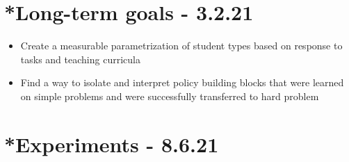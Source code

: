 \documentclass[letterpaper]{article}
\theoremstyle{definition}
\begin{document}
\section{*Long-term goals - 3.2.21} \label{sec:long-term}

\begin{itemize}
	\item Create a measurable parametrization of student types based on response to tasks and teaching curricula
	\item Find a way to isolate and interpret policy building blocks that were learned on simple problems and were successfully transferred to hard problem
\end{itemize}

\section{*Experiments - 8.6.21} \label{sec:experiment}
\end{document}
